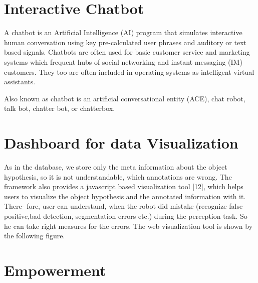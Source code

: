 \section{Interactive Chatbot}
A chatbot is an Artificial Intelligence (AI) program that simulates interactive human conversation using key pre-calculated user phrases and auditory or text based signals. Chatbots are often used for basic customer service and marketing systems which frequent hubs of social networking and instant messaging (IM) customers. They too are often included in operating systems as intelligent virtual assistants.

Also known as chatbot is an artificial conversational entity (ACE), chat robot, talk bot, chatter bot, or chatterbox.
\subsection{}
\section{Dashboard for data Visualization }
As in the database, we store only the meta information about the object hypothesis, so it is not understandable, which annotations are wrong. The framework also provides a javascript based visualization tool [12], which helps users to visualize the object hypothesis and the annotated information with it. There-
fore, user can understand, when the robot did mistake (recognize false positive,bad detection, segmentation errors etc.) during the perception task. So he can
take right measures for the errors. The web visualization tool is shown by the following figure.
\section{Empowerment}
